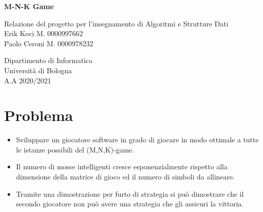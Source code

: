 \documentclass{article}
\begin{document}
\begin{titlepage}

    \begin{center}
        \vspace*{1cm}
        \Huge
        \textbf{M-N-K Game}
            
        \vspace{0.5cm}
        \LARGE
         Relazione del progetto per l'insegnamento di Algoritmi e Strutture Dati \\
        
            
        \vspace{1.0cm}
        \vfill
        Erik Koci M. 0000997662 \\ 
        Paolo Ceroni M. 0000978232\\
        \vspace{0.8cm}
            
        
            
        \Large
        Dipartimento di Informatica\\
        Università di Bologna\\
        A.A 2020/2021\\
            
    \end{center}
\end{titlepage}


\tableofcontents
\newpage

\section{Problema}
\begin{itemize}
    \item Sviluppare un giocatore software in grado di giocare in modo ottimale a tutte le istanze possibili del (M,N,K)-game.
    \item Il numero di mosse intelligenti cresce esponenzialmente rispetto alla dimensione della matrice di gioco ed il numero di simboli da allineare.
    \item Tramite una dimostrazione per furto di strategia si può dimostrare che il secondo giocatore non può avere una strategia che gli assicuri la vittoria.
\end{itemize}
\end{document}
